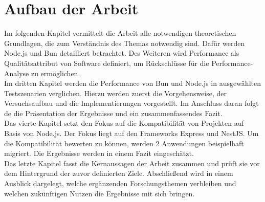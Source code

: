 \section{Aufbau der Arbeit} \label{sec:introduction-overview}
Im folgenden Kapitel vermittelt die Arbeit alle notwendigen theoretischen Grundlagen, die zum Verständnis des Themas notwendig sind. Dafür werden Node.js und Bun detailliert betrachtet. Des Weiteren wird Performance als Qualitätsattribut von Software definiert, um Rückschlüsse für die Performance-Analyse zu ermöglichen.\\

\noindent
Im dritten Kapitel werden die Performance von Bun und Node.js in ausgewählten Testszenarien verglichen. Hierzu werden zuerst die Vorgehensweise, der Versuchsaufbau und die Implementierungen vorgestellt. Im Anschluss daran folgt de die Präsentation der Ergebnisse und ein zusammenfassendes Fazit.\\

\noindent
Das vierte Kapitel setzt den Fokus auf die Kompatibilität von Projekten auf Basis von Node.js. Der Fokus liegt auf den Frameworks Express und NestJS. Um die Kompatibilität bewerten zu können, werden 2 Anwendungen beispielhaft migriert. Die Ergebnisse werden in einem Fazit eingeschätzt.\\

\noindent
Das letzte Kapitel fasst die Kernaussagen der Arbeit zusammen und prüft sie vor dem Hintergrund der zuvor definierten Ziele. Abschließend wird in einem Ausblick dargelegt, welche ergänzenden Forschungsthemen verbleiben und welchen zukünftigen Nutzen die Ergebnisse mit sich bringen.


